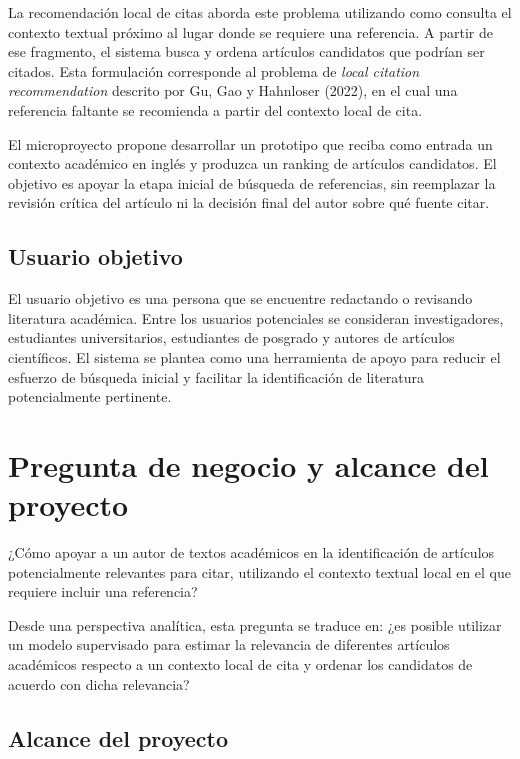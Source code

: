 \documentclass[11pt]{article}
\newcommand{\notabox}[1]{%
  \begin{tcolorbox}[colback=lightgray, colframe=accentblue, boxrule=0.6pt,
    left=8pt, right=8pt, top=6pt, bottom=6pt, arc=2pt]
    \small #1
  \end{tcolorbox}
}
\begin{document}
La recomendación local de citas aborda este problema utilizando como consulta el contexto textual próximo al lugar donde se requiere una referencia. A partir de ese fragmento, el sistema busca y ordena artículos candidatos que podrían ser citados. Esta formulación corresponde al problema de \textit{local citation recommendation} descrito por Gu, Gao y Hahnloser (2022), en el cual una referencia faltante se recomienda a partir del contexto local de cita.

El microproyecto propone desarrollar un prototipo que reciba como entrada un contexto académico en inglés y produzca un ranking de artículos candidatos. El objetivo es apoyar la etapa inicial de búsqueda de referencias, sin reemplazar la revisión crítica del artículo ni la decisión final del autor sobre qué fuente citar.

\subsection{Usuario objetivo}

El usuario objetivo es una persona que se encuentre redactando o revisando literatura académica. Entre los usuarios potenciales se consideran investigadores, estudiantes universitarios, estudiantes de posgrado y autores de artículos científicos. El sistema se plantea como una herramienta de apoyo para reducir el esfuerzo de búsqueda inicial y facilitar la identificación de literatura potencialmente pertinente.

\section{Pregunta de negocio y alcance del proyecto}

\notabox{¿Cómo apoyar a un autor de textos académicos en la identificación de artículos potencialmente relevantes para citar, utilizando el contexto textual local en el que requiere incluir una referencia?}

Desde una perspectiva analítica, esta pregunta se traduce en: ¿es posible utilizar un modelo supervisado para estimar la relevancia de diferentes artículos académicos respecto a un contexto local de cita y ordenar los candidatos de acuerdo con dicha relevancia?

\subsection{Alcance del proyecto}
\end{document}
